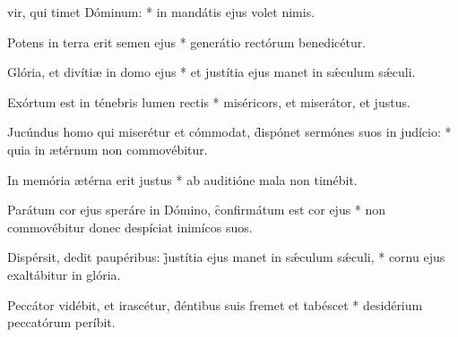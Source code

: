 \begin{psalmus}

     vir, qui timet Dóminum: * in mandátis ejus volet nimis.

    Potens in terra erit semen ejus * generátio rectórum benedicétur.

    Glória, et divítiæ in domo ejus * et justítia ejus manet in sǽculum sǽculi.

    Exórtum est in ténebris lumen rectis * miséricors, et miserátor, et justus.

    Jucúndus homo qui miserétur et cómmodat, \f dispónet sermónes suos in judício: * quia in ætérnum non commovébitur.

    In memória ætérna erit justus * ab auditióne mala non timébit.

    Parátum cor ejus speráre in Dómino, \f confirmátum est cor ejus * non commovébitur donec despíciat inimícos suos.

    Dispérsit, dedit paupéribus: \f justítia ejus manet in sǽculum sǽculi, * cornu ejus exaltábitur in glória.

    Peccátor vidébit, et irascétur, \f déntibus suis fremet et tabéscet * desidérium peccatórum períbit.

\end{psalmus}
